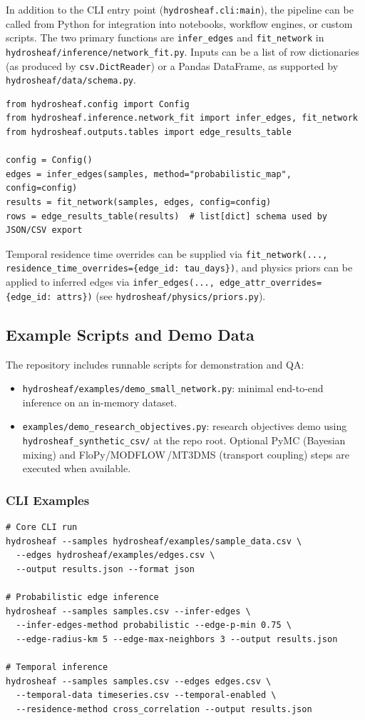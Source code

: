 \documentclass[12pt,a4paper]{article}
\theoremstyle{plain}
\theoremstyle{definition}
\theoremstyle{remark}
\begin{document}
In addition to the CLI entry point (\texttt{hydrosheaf.cli:main}), the pipeline can be called from Python for integration into notebooks, workflow engines, or custom scripts. The two primary functions are \texttt{infer\_edges} and \texttt{fit\_network} in \texttt{hydrosheaf/inference/network\_fit.py}. Inputs can be a list of row dictionaries (as produced by \texttt{csv.DictReader}) or a Pandas DataFrame, as supported by \texttt{hydrosheaf/data/schema.py}.


\begin{verbatim}
from hydrosheaf.config import Config
from hydrosheaf.inference.network_fit import infer_edges, fit_network
from hydrosheaf.outputs.tables import edge_results_table

config = Config()
edges = infer_edges(samples, method="probabilistic_map", config=config)
results = fit_network(samples, edges, config=config)
rows = edge_results_table(results)  # list[dict] schema used by JSON/CSV export
\end{verbatim}

Temporal residence time overrides can be supplied via \verb|fit_network(..., residence_time_overrides={edge_id: tau_days})|, and physics priors can be applied to inferred edges via \verb|infer_edges(..., edge_attr_overrides={edge_id: attrs})| (see \texttt{hydrosheaf/physics/priors.py}).

\subsection{Example Scripts and Demo Data}

The repository includes runnable scripts for demonstration and QA:
\begin{itemize}
	\item \texttt{hydrosheaf/examples/demo\_small\_network.py}: minimal end-to-end inference on an in-memory dataset.
	\item \texttt{examples/demo\_research\_objectives.py}: research objectives demo using \texttt{hydrosheaf\_synthetic\_csv/} at the repo root. Optional PyMC (Bayesian mixing) and FloPy/MODFLOW\,/MT3DMS (transport coupling) steps are executed when available.
\end{itemize}

\subsubsection{CLI Examples}

\begin{verbatim}
# Core CLI run
hydrosheaf --samples hydrosheaf/examples/sample_data.csv \
  --edges hydrosheaf/examples/edges.csv \
  --output results.json --format json

# Probabilistic edge inference
hydrosheaf --samples samples.csv --infer-edges \
  --infer-edges-method probabilistic --edge-p-min 0.75 \
  --edge-radius-km 5 --edge-max-neighbors 3 --output results.json

# Temporal inference
hydrosheaf --samples samples.csv --edges edges.csv \
  --temporal-data timeseries.csv --temporal-enabled \
  --residence-method cross_correlation --output results.json
\end{verbatim}
\end{document}
